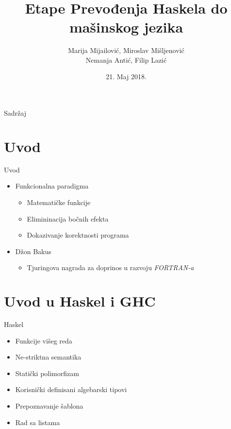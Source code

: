 \documentclass{beamer}
\title[Kompilacija funkcionalnih jezika]{Etape Prevođenja Haskela do mašinskog jezika}
\author[]{Marija Mijailović, Miroslav Mišljenović\\Nemanja Antić, Filip Lazić}
\institute{Matematički fakultet, Beograd}
\date{21. Maj 2018.}
\begin{document}
\begin{frame}
  \titlepage
\end{frame}

\begin{frame}{Sadržaj}
  \tableofcontents
\end{frame}

\section{Uvod}

\begin{frame}{Uvod}
	\begin{itemize}
  		\item Funkcionalna paradigma 
	  		\begin{itemize}
	  			\item Matematičke funkcije
	  			\item Elimininacija bočnih efekta
	  			\item Dokazivanje korektnosti programa
	  		\end{itemize}
  		\vspace{0.5cm}
  		\item Džon Bakus
	  		\begin{itemize}
	  			\item Tjuringova nagrada za doprinos u razvoju \textit{FORTRAN-a}
	  		\end{itemize}
  	\end{itemize}
\end{frame}

\section{Uvod u Haskel i GHC}
\begin{frame}{Haskel}
	\begin{itemize}
 	  	\item Funkcije višeg reda
  		\item Ne-striktna semantika
  		\item Statički polimorfizam
  		\item Korisnički definisani algebarski tipovi
  		\item Prepoznavanje šablona 
  		\item Rad sa listama
  	\end{itemize}
\end{frame}
\end{document}
